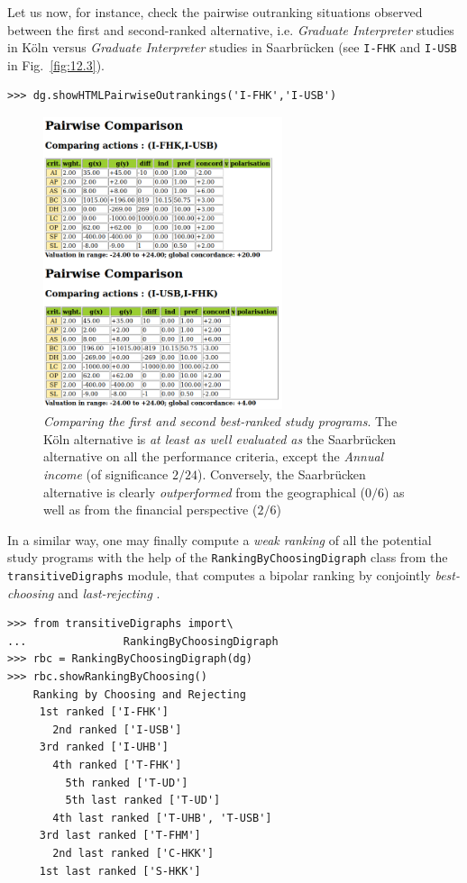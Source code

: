Let us now, for instance, check the pairwise outranking situations observed between the first and second-ranked alternative, i.e. \emph{Graduate Interpreter} studies in Köln versus \emph{Graduate Interpreter} studies in Saarbrücken (see \texttt{I-FHK} and \texttt{I-USB} in Fig.~\vref{fig:12.3}).
\begin{lstlisting}
>>> dg.showHTMLPairwiseOutrankings('I-FHK','I-USB')
\end{lstlisting}
\begin{figure}[ht]
\sidecaption[t]
\includegraphics[width=7cm]{Figures/12-6-pairwiseComparison.png}
\caption[Comparing the first and second best-ranked study programs]{\emph{Comparing the first and second best-ranked study programs}. The Köln alternative is \emph{at least as well evaluated as} the Saarbrücken alternative on all the performance criteria, except the \emph{Annual income} (of significance $2/24$). Conversely, the Saarbrücken alternative is clearly \emph{outperformed} from the geographical ($0/6$) as well as from the financial perspective ($2/6$)}
\label{fig:12.6}       %
\end{figure}

In a similar way, one may finally compute a \emph{weak ranking} of all the potential study programs with the help of the \texttt{RankingByChoosingDigraph} class from the \texttt{transitiveDigraphs} module, that computes a bipolar ranking by conjointly \emph{best-choosing} and \emph{last-rejecting} \citep{BIS-1999}.
\begin{lstlisting}[caption={Weakly ranking by bipolar best-choosing and last-rejecting},label=list:12.6]
>>> from transitiveDigraphs import\
...               RankingByChoosingDigraph
>>> rbc = RankingByChoosingDigraph(dg)
>>> rbc.showRankingByChoosing()
    Ranking by Choosing and Rejecting
     1st ranked ['I-FHK'] 
       2nd ranked ['I-USB']
	 3rd ranked ['I-UHB']
	   4th ranked ['T-FHK']
	     5th ranked ['T-UD']
	     5th last ranked ['T-UD']
	   4th last ranked ['T-UHB', 'T-USB']
	 3rd last ranked ['T-FHM']
       2nd last ranked ['C-HKK']
     1st last ranked ['S-HKK']
\end{lstlisting}

